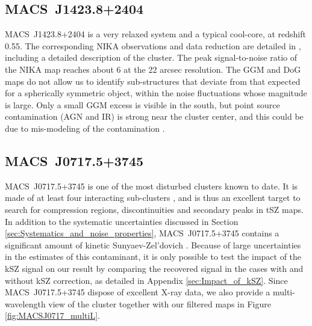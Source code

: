 \documentclass[twocolumn,traditabstract]{aa}
\begin{document}
\subsection{MACS~J1423.8+2404}
\mbox{MACS~J1423.8+2404} is a very relaxed system and a typical cool-core, at redshift 0.55. The corresponding NIKA observations and data reduction are detailed in \cite{Adam2016a}, including a detailed description of the cluster. The peak signal-to-noise ratio of the NIKA map reaches about 6 at the 22 arcsec resolution. The GGM and DoG maps do not allow us to identify sub-structures that deviate from that expected for a spherically symmetric object, within the noise fluctuations whose magnitude is large. Only a small GGM excess is visible in the south, but point source contamination (AGN and IR) is strong near the cluster center, and this could be due to mis-modeling of the contamination \citep[see][and the discussion of Section \ref{sec:Point_sources_residuals}]{Adam2016a}.

\subsection{MACS~J0717.5+3745}\label{sec:MACSJ0717}
\mbox{MACS~J0717.5+3745} is one of the most disturbed clusters known to date. It is made of at least four interacting sub-clusters \citep{Ma2009}, and is thus an excellent target to search for compression regions, discontinuities and secondary peaks in tSZ maps. In addition to the systematic uncertainties discussed in Section \ref{sec:Systematics_and_noise_properties}, \mbox{MACS~J0717.5+3745} contains a significant amount of kinetic Sunyaev-Zel'dovich \citep[kSZ,][]{Sunyaev1980}. Because of large uncertainties in the estimates of this contaminant, it is only possible to test the impact of the kSZ signal on our result by comparing the recovered signal in the cases with and without kSZ correction, as detailed in Appendix \ref{sec:Impact_of_kSZ}. Since \mbox{MACS~J0717.5+3745} dispose of excellent X-ray data, we also provide a multi-wavelength view of the cluster together with our filtered maps in Figure \ref{fig:MACSJ0717_multiL}.
\end{document}
